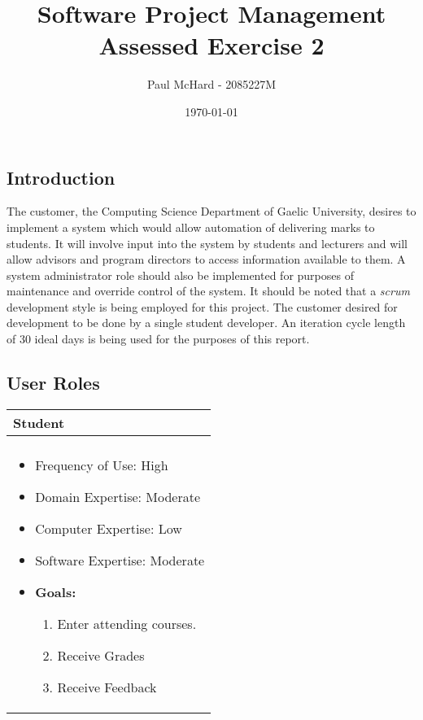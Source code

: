\documentclass[11pt]{article}
\title{Software Project Management Assessed Exercise 2}
\author{Paul McHard - 2085227M}
\date{\today}
\begin{document}
\maketitle
\subsection*{Introduction} The customer, the Computing Science Department of Gaelic University, desires to implement a system which would allow automation of delivering marks to students. It will involve input into the system by students and lecturers and will allow advisors and program directors to access information available to them. A system administrator role should also be implemented for purposes of maintenance and override control of the system. It should be noted that a \emph{scrum} development style is being employed for this project. The customer desired for development to be done by a single student developer. An iteration cycle length of 30 ideal days is being used for the purposes of this report.
\subsection*{User Roles}
\begin{center}
\begin{tabular}{ | m{12cm} | } 
 \hline
 \textbf{Student}   \\ 
  \hline
  \\[5pt]			
\begin{itemize}
\item{Frequency of Use: High}
\item{Domain Expertise: Moderate}
\item{Computer Expertise: Low}
\item{Software Expertise: Moderate}
\item{\textbf{Goals:}}
\begin{enumerate}
\item{Enter attending courses.}
\item{Receive Grades}
\item{Receive Feedback}
\end{enumerate}
\end{itemize} \\
 \hline
\end{tabular}
\end{center}
\end{document}
